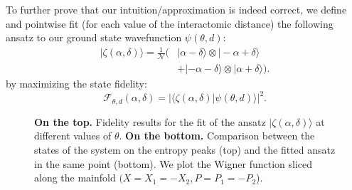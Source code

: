 \documentclass[reprint, amsmath, amssymb, floatfix, aps, pra]{revtex4-2}
\newcommand{\ket}[1]{|#1\rangle}
\newcommand{\braket}[3][2]{\langle #2|#3 \rangle}
\begin{document}
    To further prove that our intuition/approximation is indeed correct, we define and pointwise fit (for each value of the interactomic distance) the following ansatz to our ground state wavefunction $\psi(\theta, d)$:
    \begin{equation*}
    \begin{split}
        \ket{\zeta(\alpha, \delta)} = \frac{1}{\mathcal N}(&\ket{\alpha-\delta}\otimes\ket{-\alpha + \delta} \\
        &+ \ket{-\alpha-\delta}\otimes\ket{\alpha + \delta}).
    \end{split}
    \end{equation*}
    by maximizing the state fidelity:
    \begin{equation*}
        \mathcal{F}_{\theta, d}(\alpha, \delta) = |\braket{\zeta(\alpha, \delta)}{\psi(\theta, d)}|^2.
    \end{equation*}
    \begin{figure}[h]
        \centering
        \vspace{-3ex}
        \caption{\label{fig:fidecats}\textbf{On the top.} Fidelity results for the fit of the ansatz $\ket{\zeta(\alpha, \delta)}$ at different values of $\theta$. \textbf{On the bottom.} Comparison between the states of the system on the entropy peaks (top) and the fitted ansatz in the same point (bottom). We plot the Wigner function sliced along the mainfold $(X = X_1 = -X_2, P = P_1 = -P_2$).}
    \end{figure}
\end{document}
